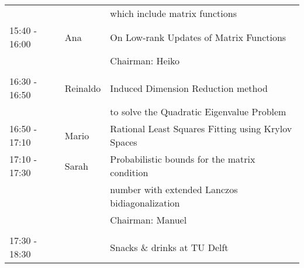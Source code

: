 \documentclass{article}
\begin{document}
\begin{table}[h]
\begin{tabular}{lll}
                  & & which include matrix functions\\ [0.5ex]
15:40 - 16:00 & Ana & On Low-rank Updates of Matrix Functions\\ [0.5ex]
& & \hfill \small{Chairman: Heiko}  \\
\hline \\ [-1.5ex]
16:30 - 16:50 & Reinaldo & Induced Dimension Reduction method \\
            & & to solve the Quadratic Eigenvalue Problem \\ [0.5ex]
16:50 - 17:10 & Mario & Rational Least Squares Fitting using Krylov Spaces\\ [0.5ex]
17:10 - 17:30 & Sarah & Probabilistic bounds for the matrix condition  \\
                    & & number with extended Lanczos bidiagonalization\\ [0.5ex]
& & \hfill \small{Chairman: Manuel}\\
\hline \\ [-1.5ex]
17:30 - 18:30 & & Snacks \& drinks at TU Delft
\end{tabular}
\end{table}
\end{document}
